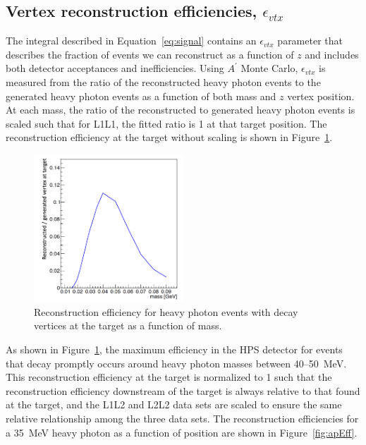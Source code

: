 \subsection{Vertex reconstruction efficiencies, $\epsilon_{vtx}$}
The integral described in Equation~\eqref{eq:signal} contains an $\epsilon_{vtx}$ parameter that describes the fraction of events we can reconstruct as a function of $z$ and includes both detector acceptances and inefficiencies. Using $A^{\prime}$ Monte Carlo, $\epsilon_{vtx}$ is measured from the ratio of the reconstructed heavy photon events to the generated heavy photon events as a function of both mass and $z$ vertex position. At each mass, the ratio of the reconstructed to generated heavy photon events is scaled such that for L1L1, the fitted ratio is 1 at that target position. The reconstruction efficiency at the target without scaling is shown in Figure~\ref{fig:rawEff}.
\begin{figure}[htb]
  \centering
      \includegraphics[width=0.5\textwidth]{pics/searching/rawEffL1L1.png}
  \caption[Reconstruction efficiency for heavy photons that decay at the target]{Reconstruction efficiency for heavy photon events with decay vertices at the target as a function of mass.}
  \label{fig:rawEff}
\end{figure} 
As shown in Figure~\ref{fig:rawEff}, the maximum efficiency in the HPS detector for events that decay promptly occurs around heavy photon masses between 40--50~MeV. This reconstruction efficiency at the target is normalized to 1 such that the reconstruction efficiency downstream of the target is always relative to that found at the target, and the L1L2 and L2L2 data sets are scaled to ensure the same relative relationship among the three data sets. The reconstruction efficiencies for a 35~MeV heavy photon as a function of position are shown in Figure~\ref{fig:apEff}. 
